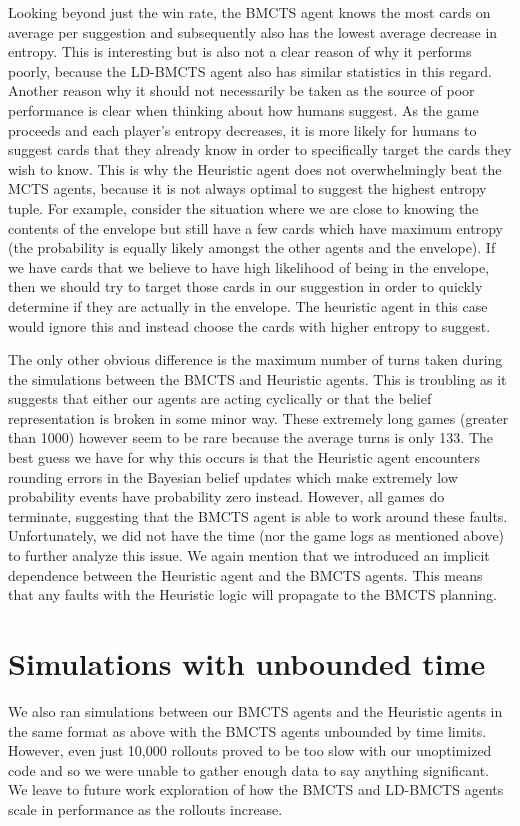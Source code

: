 \documentclass[msc, ai, logo, twoside, notimes, parskip, leftchapter, normalheadings]{infthesis}
\begin{document}
Looking beyond just the win rate, the BMCTS agent knows the most cards on average per suggestion and subsequently also has the lowest average decrease in entropy. This is interesting but is also not a clear reason of why it performs poorly, because the LD-BMCTS agent also has similar statistics in this regard. Another reason why it should not necessarily be taken as the source of poor performance is clear when thinking about how humans suggest. As the game proceeds and each player's entropy decreases, it is more likely for humans to suggest cards that they already know in order to specifically target the cards they wish to know. This is why the Heuristic agent does not overwhelmingly beat the MCTS agents, because it is not always optimal to suggest the highest entropy tuple. For example, consider the situation where we are close to knowing the contents of the envelope but still have a few cards which have maximum entropy (the probability is equally likely amongst the other agents and the envelope). If we have cards that we believe to have high likelihood of being in the envelope, then we should try to target those cards in our suggestion in order to quickly determine if they are actually in the envelope. The heuristic agent in this case would ignore this and instead choose the cards with higher entropy to suggest. 

The only other obvious difference is the maximum number of turns taken during the simulations between the BMCTS and Heuristic agents. This is troubling as it suggests that either our agents are acting cyclically or that the belief representation is broken in some minor way. These extremely long games (greater than 1000) however seem to be rare because the average turns is only 133. The best guess we have for why this occurs is that the Heuristic agent encounters rounding errors in the Bayesian belief updates which make extremely low probability events have probability zero instead. However, all games do terminate, suggesting that the BMCTS agent is able to work around these faults. Unfortunately, we did not have the time (nor the game logs as mentioned above) to further analyze this issue. We again mention that we introduced an implicit dependence between the Heuristic agent and the BMCTS agents. This means that any faults with the Heuristic logic will propagate to the BMCTS planning.

\section{Simulations with unbounded time}
We also ran simulations between our BMCTS agents and the Heuristic agents in the same format as above with the BMCTS agents unbounded by time limits. However, even just 10,000 rollouts proved to be too slow with our unoptimized code and so we were unable to gather enough data to say anything significant. We leave to future work exploration of how the BMCTS and LD-BMCTS agents scale in performance as the rollouts increase.
\end{document}
